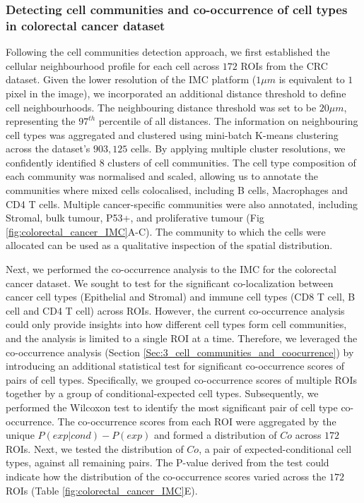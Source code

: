 \subsubsection{Detecting cell communities and co-occurrence of cell types in colorectal cancer dataset}
Following the cell communities detection approach, we first established the cellular neighbourhood profile for each cell across $172$ ROIs from the CRC dataset. Given the lower resolution of the IMC platform ($1\mu m$ is equivalent to $1$ pixel in the image), we incorporated an additional distance threshold to define cell neighbourhoods. The neighbouring distance threshold was set to be  $20\mu m$, representing the $97^{th}$ percentile of all distances. The information on neighbouring cell types was aggregated and clustered using mini-batch K-means clustering across the dataset's $903,125$ cells. By applying multiple cluster resolutions, we confidently identified 8 clusters of cell communities. The cell type composition of each community was normalised and scaled, allowing us to annotate the communities where mixed cells colocalised, including B cells, Macrophages and CD4 T cells. Multiple cancer-specific communities were also annotated, including Stromal, bulk tumour, P53+, and proliferative tumour (Fig \ref{fig:colorectal_cancer_IMC}A-C). The community to which the cells were allocated can be used as a qualitative inspection of the spatial distribution.  

Next, we performed the co-occurrence analysis to the IMC for the colorectal cancer dataset.  We sought to test for the significant co-localization between cancer cell types (\ie Epithelial and Stromal) and immune cell types (\ie CD8 T cell, B cell and CD4 T cell) across ROIs. However, the current co-occurrence analysis could only provide insights into how different cell types form cell communities, and the analysis is limited to a single ROI at a time. Therefore, we leveraged the co-occurrence analysis (Section \ref{Sec:3_cell_communities_and_coocurrence}) by introducing an additional statistical test for significant co-occurrence scores of pairs of cell types. Specifically, we grouped co-occurrence scores of multiple ROIs together by a group of conditional-expected cell types. Subsequently, we performed the Wilcoxon test to identify the most significant pair of cell type co-occurrence. The co-occurrence scores from each ROI were aggregated by the unique $P(exp|cond)-P(exp)$ and formed a distribution of $Co$ across $172$ ROIs. Next, we tested the distribution of $Co$, a pair of expected-conditional cell types, against all remaining pairs. The P-value derived from the test could indicate how the distribution of the co-occurrence scores varied across the $172$ ROIs (Table \ref{fig:colorectal_cancer_IMC}E).
